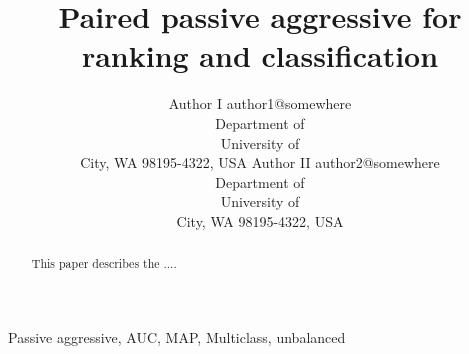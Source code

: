 \documentclass[twoside,11pt]{article}
\begin{document}
\title{Paired passive aggressive for ranking and classification}

\author{       \name Author I \email author1@somewhere \\
       \addr Department of \\
       University of \\
       City, WA 98195-4322, USA
       \AND
       \name Author II \email author2@somewhere \\
       \addr Department of \\
       University of \\
       City, WA 98195-4322, USA
       }

\maketitle

\begin{abstract}%
This paper describes the ....
\end{abstract}

\begin{keywords}
  Passive aggressive, AUC, MAP, Multiclass, unbalanced
\end{keywords}












\newpage

\appendix





\vskip 0.2in

\end{document}
